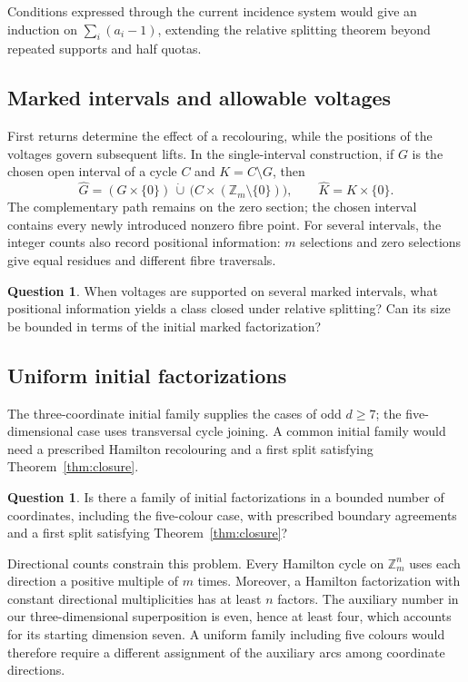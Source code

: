 \documentclass[11pt,reqno]{amsart}
\numberwithin{equation}{section}
\theoremstyle{definition}
\newtheorem{question}[theorem]{Question}
\theoremstyle{remark}
\begin{document}
Conditions expressed through the current incidence system would give
an induction on $\sum_i(a_i-1)$, extending the relative splitting
theorem beyond repeated supports and half quotas.

\subsection{Marked intervals and allowable voltages}
First returns determine the effect of a recolouring, while the positions
of the voltages govern subsequent lifts. In the single-interval
construction, if $G$ is the chosen open interval of a cycle $C$ and
$K=C\setminus G$, then
\[
 \widehat G=(G\times\{0\})\,\dot\cup\,
 \bigl(C\times(\mathbb Z_m\setminus\{0\})\bigr),
 \qquad \widehat K=K\times\{0\}.
\]
The complementary path remains on the zero section; the chosen
interval contains every newly introduced nonzero fibre point. For
several intervals, the integer counts also record positional information:
$m$ selections and zero selections give equal residues and different
fibre traversals.

\begin{question}\label{ques:return-times}\label{ques:resource-state}
When voltages are supported on several marked intervals, what positional
information yields a class closed under relative splitting? Can its
size be bounded in terms of the initial marked factorization?
\end{question}

\subsection{Uniform initial factorizations}
The three-coordinate initial family supplies the cases of odd $d\ge7$;
the five-dimensional case uses transversal cycle joining. A common
initial family would need a prescribed Hamilton recolouring and a
first split satisfying Theorem~\ref{thm:closure}.

\begin{question}\label{ques:entry-unification}
Is there a family of initial factorizations in a bounded number of
coordinates, including the five-colour case, with prescribed boundary
agreements and a first split satisfying Theorem~\ref{thm:closure}?
\end{question}

Directional counts constrain this problem. Every Hamilton cycle on
$\mathbb Z_m^n$ uses each direction a positive multiple of $m$ times.
Moreover, a Hamilton factorization with constant directional
multiplicities has at least $n$ factors. The auxiliary number in our
three-dimensional superposition is even, hence at least four, which
accounts for its starting dimension seven. A uniform family including five colours would therefore require a
different assignment of the auxiliary arcs among coordinate directions.
\end{document}
